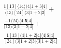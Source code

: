 \documentclass[varwidth, border=5pt]{standalone}
\begin{document}
\begin{my}
$\begin{gathered}
\scriptscriptstyle\frac{1[13]⟨14⟩⟨4|1+3|4]}{⟨13⟩[24]⟨3|1+2|3]} +\\
\scriptscriptstyle\frac{-1⟨24⟩⟨4|𝟓|4]}{⟨13⟩⟨3|1+2|4]} +\\
\scriptscriptstyle\frac{1[13]⟨4|1+2|4]⟨4|𝟓|4]}{[24]⟨3|1+2|3]⟨3|1+2|4]} \phantom{+}
\end{gathered}$
\end{my}
\end{document}
